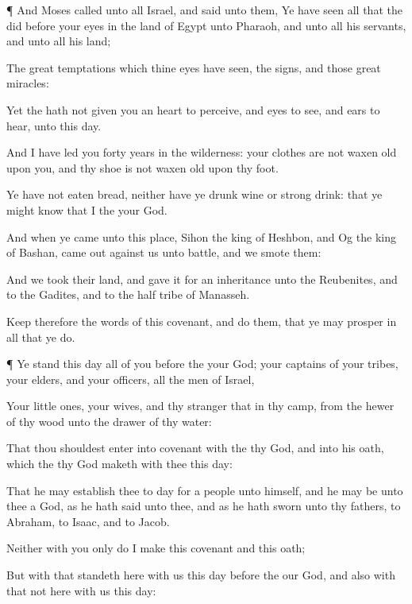 {\par }{\PP {}¶ And
Moses
called unto all
Israel, and
said unto them, Ye have
seen all that the
{}
did before your
eyes in the
land of
Egypt unto
Pharaoh, and unto all his
servants, and unto all his
land;

The
great
temptations which thine
eyes have
seen, the
signs, and those
great
miracles:

Yet the
{} hath not
given you an
heart to
perceive, and
eyes to
see, and
ears to
hear, unto this
day.

And I have
led you
forty
years in the
wilderness: your
clothes are not waxen
old upon you, and thy
shoe is not waxen
old upon thy
foot.

Ye have not
eaten
bread, neither have ye
drunk
wine or strong
drink: that ye might
know that I
{} the
{} your
God.

And when ye
came unto this
place,
Sihon the
king of
Heshbon, and
Og the
king of
Bashan, came
out
against us unto
battle, and we
smote them:

And we
took their
land, and
gave it for an
inheritance unto the
Reubenites, and to the
Gadites, and to the
half
tribe of
Manasseh.

Keep therefore the
words of this
covenant, and
do them, that ye may
prosper in all that ye
do.


\par }{\PP {}¶ Ye
stand this
day all of you
before the
{} your
God; your
captains of your
tribes, your
elders, and your
officers,
{} all the
men of
Israel,

Your little
ones, your
wives, and thy
stranger that
{}
in thy
camp, from the
hewer of thy
wood unto the
drawer of thy
water:

That thou shouldest
enter into
covenant with the
{} thy
God, and into his
oath, which the
{} thy
God
maketh with thee this
day:

That he may
establish thee to
day for a
people unto himself, and
{} he may be unto thee a
God, as he hath
said unto thee, and as he hath
sworn unto thy
fathers, to
Abraham, to
Isaac, and to
Jacob.

Neither with you only do I
make this
covenant and this
oath;

But with
{} that
standeth here with us
this
day
before the
{} our
God, and also with
{} that
{} not here with us this
day:

}
